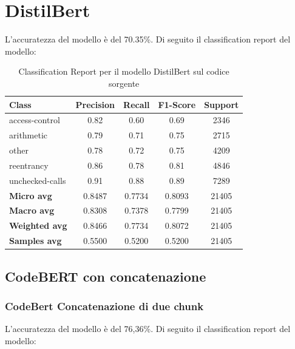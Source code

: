 \documentclass[../../Thesis.tex]{subfiles}
\begin{document}
\section{DistilBert}
L'accuratezza del modello è del 70.35\%. Di seguito il classification report del modello:

\begin{table}[H]
    \centering
    \small
    \begin{tabular}{lcccc}
    \hline
    \textbf{Class} & \textbf{Precision} & \textbf{Recall} & \textbf{F1-Score} & \textbf{Support} \\
    \hline
    access-control & 0.82 & 0.60 & 0.69 & 2346 \\
    arithmetic & 0.79 & 0.71 & 0.75 & 2715 \\
    other & 0.78 & 0.72 & 0.75 & 4209 \\
    reentrancy & 0.86 & 0.78 & 0.81 & 4846 \\
    unchecked-calls & 0.91 & 0.88 & 0.89 & 7289 \\
    \hline
    \textbf{Micro avg} & 0.8487 & 0.7734 & 0.8093 & 21405 \\
    \textbf{Macro avg} & 0.8308 & 0.7378 & 0.7799 & 21405 \\
    \textbf{Weighted avg} & 0.8466 & 0.7734 & 0.8072 & 21405 \\
    \textbf{Samples avg} & 0.5500 & 0.5200 & 0.5200 & 21405 \\
    \hline
    \end{tabular}
    \caption{Classification Report per il modello DistilBert sul codice sorgente}
\end{table}

\subsection{CodeBERT con concatenazione}
\subsubsection{CodeBert Concatenazione di due chunk}
L'accuratezza del modello è del 76,36\%. Di seguito il classification report del modello:
\end{document}
